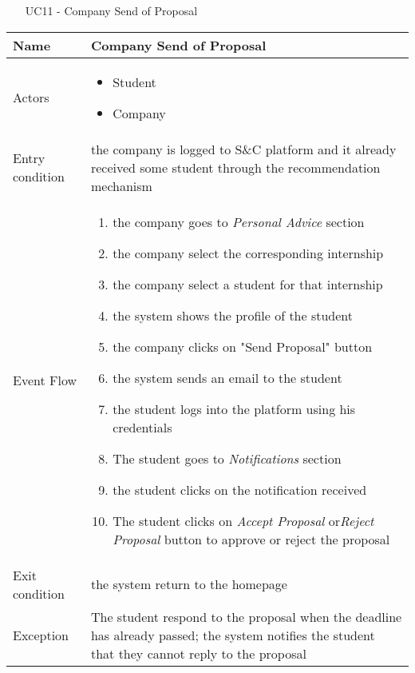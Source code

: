 				
			
				
				\begin{table} [H]
					\centering
						\begin{itemize}
						\item [UC11] - Company Send of Proposal
					\end{itemize}
					\begin{tabular}{|| P{7.5cm} | P{7.5cm} ||}
						\hline
						Name & Company Send of Proposal \\
						\hline
						Actors & \parbox{5cm}{\begin{itemize}
								\item Student
								\item Company
							\end{itemize}
						} \\
						\hline
						Entry condition & the company is logged to S\&C platform and it already received some student through the recommendation mechanism \\
						\hline
						Event Flow & \parbox{5cm}{\begin{enumerate}
								\item the company goes to \textit{Personal Advice} section
								\item the company select the corresponding internship 
								\item the company select a student for that internship
								\item the system shows the profile of the student
								\item the company clicks on "Send Proposal" button
								\item the system sends an email to the student
								\item the student logs into the platform using his credentials
								\item The student goes to \textit{Notifications} 
								section 
								\item the student clicks on the notification 
								received 
								\item The student clicks on \textit{Accept 
									Proposal} or\textit{Reject Proposal}
								button to approve or reject the 
								proposal
						\end{enumerate}} \\
						\hline 
						Exit condition & the system return to the homepage \\
						\hline
						Exception & The student respond to the proposal when the deadline has already passed; the 
								system notifies the student that they 
								cannot reply to the proposal \\
						\hline
					\end{tabular}
				\end{table}
				
